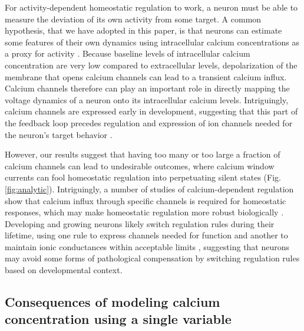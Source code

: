 \documentclass[9pt,lineno]{elife}
\begin{document}
For activity-dependent homeostatic regulation to work, a neuron must be able to measure the deviation of its own activity from some target. A common hypothesis, that we have adopted in this paper, is that neurons can estimate some features of their own dynamics using intracellular calcium concentrations as a proxy for activity \citep{LeMasson:1993jz,Siegel:1994ue,Gunay:2010jh,Golowasch:1999ha,Davis:2006wd,OLeary:2011fd}. Because baseline levels of intracellular calcium concentration are very low compared to extracellular levels, depolarization of the membrane that opens calcium channels can lead to a transient calcium influx. Calcium channels therefore can play an important role in directly mapping the voltage dynamics of a neuron onto its intracellular calcium levels. Intriguingly, calcium channels are expressed early in development, suggesting that this part of the feedback loop precedes regulation and expression of ion channels needed for the neuron's target behavior \citep{Baccaglini:1977, Liljelund:2000em, Yamashita:1993fy, Faure:2001gg,Heusser:2005jz}.

However, our results suggest that having too many or too large a fraction of calcium channels can lead to undesirable outcomes, where calcium window currents can fool homeostatic regulation into perpetuating silent states (Fig. \ref{fig:analytic}). Intriguingly, a number of studies of calcium-dependent regulation show that calcium influx through specific channels is required for homeostatic responses, which may make homeostatic regulation more robust biologically \citep{OLeary:2010hq,wheeler2012cav1}. Developing and growing neurons likely switch regulation rules during their lifetime, using one rule to express channels needed for function and another to maintain ionic conductances within acceptable limits  \citep{Desai:1999ib}, suggesting that neurons may avoid some forms of pathological compensation by switching regulation rules based on developmental context. 


\subsection{Consequences of modeling calcium concentration using a single variable}
\end{document}
